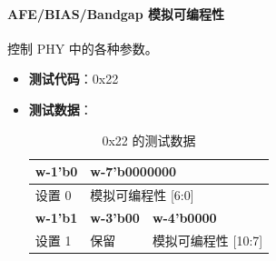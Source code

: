 \documentclass[main\_\_CN.tex]{subfiles}
\begin{document}
\paragraph{AFE/BIAS/Bandgap 模拟可编程性}
\label{sec:test-code-0x22}
控制 PHY 中的各种参数。

\begin{itemize}
    \item \textbf{测试代码}：0x22
    \item \textbf{测试数据}：
        \begin{longtable}{ |p{2cm}|p{4cm}|p{6cm}| }
            \caption{0x22 的测试数据}
            \label{tab:test-data-0x22} \\
            \hline
            \rowcolor{lightgray}
            \textbf{w-1'b0} & \multicolumn{2}{l|}{\textbf{w-7'b0000000}} \\ \hline
            设置 0 & \multicolumn{2}{l|}{模拟可编程性 [6:0]}  \\ \hline
            \rowcolor{lightgray}
            \textbf{w-1'b1} & \textbf{w-3'b00} & \textbf{w-4'b0000} \\ \hline
            设置 1 & 保留 & 模拟可编程性 [10:7]  \\ \hline
        \end{longtable}


\end{itemize}
\end{document}
